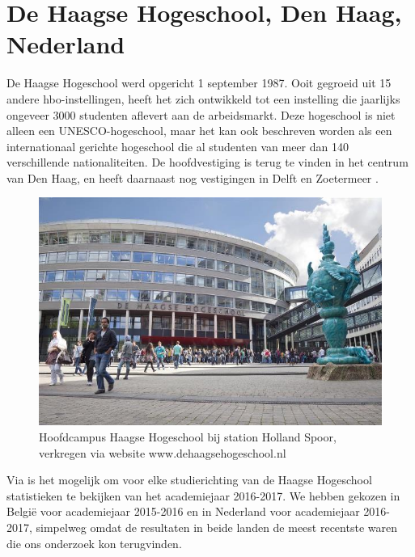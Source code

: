 \section{De Haagse Hogeschool, Den Haag, Nederland}
\label{sec:haagsehogeschool}

De Haagse Hogeschool werd opgericht 1 september 1987. Ooit gegroeid uit 15 andere hbo-instellingen, heeft het zich ontwikkeld tot een instelling die jaarlijks ongeveer 3000 studenten aflevert aan de arbeidsmarkt. Deze hogeschool is niet alleen een UNESCO-hogeschool, maar het kan ook beschreven worden als een internationaal gerichte hogeschool die al studenten van meer dan 140 verschillende nationaliteiten. De hoofdvestiging is terug te vinden in het centrum van Den Haag, en heeft daarnaast nog vestigingen in Delft en Zoetermeer \autocite{HaagseHogeschool2017}. 

\begin{figure}[!h]
	\includegraphics[width=\textwidth]
	{img/haagse_hogeschool.jpg}
	\caption{Hoofdcampus Haagse Hogeschool bij station Holland Spoor, verkregen via website www.dehaagsehogeschool.nl}
	\label{fig:haagsehogeschool}
\end{figure}

Via \textcite{Studiekeuze2017} is het mogelijk om voor elke studierichting van de Haagse Hogeschool statistieken te bekijken van het academiejaar 2016-2017. We hebben gekozen in België voor academiejaar 2015-2016 en in Nederland voor academiejaar 2016-2017, simpelweg omdat de resultaten in beide landen de meest recentste waren die ons onderzoek kon terugvinden.


